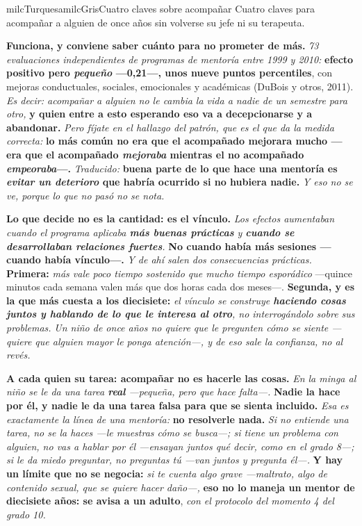 \documentclass[11pt,letterpaper]{article}
\newcommand{\milcpaso}[3]{%
\Needspace{4\baselineskip}%
\begin{tcolorbox}[enhanced,colback=white,colframe=milcLinea,arc=1.5mm,boxrule=.9pt,
  left=14mm,right=4mm,top=3mm,bottom=3mm,before skip=4pt,after skip=4pt,
  fontupper=\RaggedRight,
  overlay={\node[anchor=north west,circle,fill=#2,text=white,inner sep=0pt,
    minimum size=7.4mm,font=\sffamily\bfseries\small]
    at ([xshift=3.6mm,yshift=-3.2mm]frame.north west) {#1};}]
#3
\end{tcolorbox}}
\begin{document}
\begin{softbox}{milcTurquesa}{milcGris}{Cuatro claves sobre acompañar}
Cuatro claves para acompañar a alguien de once años sin volverse su jefe ni su terapeuta.
\end{softbox}

\milcpaso{1}{milcTurquesa}{\textbf{Funciona, y conviene saber cuánto para no prometer de más.} \emph{73 evaluaciones independientes de programas de mentoría entre 1999 y 2010:} \textbf{efecto positivo pero \emph{pequeño} ---0,21---, unos nueve puntos percentiles}, con mejoras conductuales, sociales, emocionales y académicas (DuBois y otros, 2011). \emph{Es decir: acompañar a alguien no le cambia la vida a nadie de un semestre para otro,} \textbf{y quien entre a esto esperando eso va a decepcionarse y a abandonar.} \emph{Pero fíjate en el hallazgo del patrón, que es el que da la medida correcta:} \textbf{lo más común no era que el acompañado mejorara mucho ---era que el acompañado \emph{mejoraba} mientras el no acompañado \emph{empeoraba}---.} \emph{Traducido:} \textbf{buena parte de lo que hace una mentoría es \emph{evitar un deterioro} que habría ocurrido si no hubiera nadie.} \emph{Y eso no se ve, porque lo que no pasó no se nota.}}
\milcpaso{2}{milcTurquesa}{\textbf{Lo que decide no es la cantidad: es el vínculo.} \emph{Los efectos aumentaban cuando el programa aplicaba \textbf{más buenas prácticas} y \textbf{cuando se desarrollaban relaciones fuertes}.} \textbf{No cuando había más sesiones ---cuando había vínculo---.} \emph{Y de ahí salen dos consecuencias prácticas.} \textbf{Primera:} \emph{más vale poco tiempo sostenido que mucho tiempo esporádico} ---quince minutos cada semana valen más que dos horas cada dos meses---. \textbf{Segunda, y es la que más cuesta a los diecisiete:} \emph{el vínculo se construye \textbf{haciendo cosas juntos y hablando de lo que le interesa al otro}, no interrogándolo sobre sus problemas.} \emph{Un niño de once años no quiere que le pregunten cómo se siente ---quiere que alguien mayor le ponga atención---, y de eso sale la confianza, no al revés.}}
\milcpaso{3}{milcTurquesa}{\textbf{A cada quien su tarea: acompañar no es hacerle las cosas.} \emph{En la minga al niño se le da una tarea \textbf{real} ---pequeña, pero que hace falta---.} \textbf{Nadie la hace por él, y nadie le da una tarea falsa para que se sienta incluido.} \emph{Esa es exactamente la línea de una mentoría:} \textbf{no resolverle nada.} \emph{Si no entiende una tarea, no se la haces ---le muestras cómo se busca---; si tiene un problema con alguien, no vas a hablar por él ---ensayan juntos qué decir, como en el grado 8---; si le da miedo preguntar, no preguntas tú ---van juntos y pregunta él---.} \textbf{Y hay un límite que no se negocia:} \emph{si te cuenta algo grave ---maltrato, algo de contenido sexual, que se quiere hacer daño---,} \textbf{eso no lo maneja un mentor de diecisiete años: se avisa a un adulto}, \emph{con el protocolo del momento 4 del grado 10.}}
\end{document}
